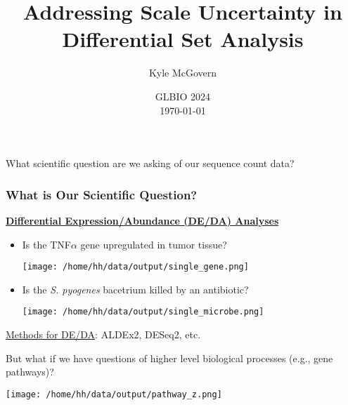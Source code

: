 \documentclass[11pt]{beamer}
\title[DSA Scale Uncertainty]{Addressing Scale Uncertainty in Differential Set Analysis}
\author[Kyle McGovern]{Kyle McGovern}
\institute[Penn State]{The Pennsylvania State University \\ \smallskip \textit{kvm6065@psu.edu}}
\date[\today]{GLBIO 2024 \\ \today}
\begin{document}

\begin{frame}
	\titlepage
\end{frame}

\begin{frame}
  \begin{center}
    What scientific question are we asking of our sequence count data?
  \end{center}
\end{frame}

\begin{frame}
  \frametitle{What is Our Scientific Question?}

  \begin{center}
    \underline{\textbf{Differential Expression/Abundance (DE/DA) Analyses}}
  \end{center}
  
  \begin{itemize}
    \item Is the TNF\(\alpha\) gene upregulated in tumor tissue?

    \begin{center}
      \texttt{[image: /home/hh/data/output/single\_gene.png]}
    \end{center}


    \item Is the \textit{S. pyogenes} bacetrium killed by an antibiotic?
        
     \begin{center}
      \texttt{[image: /home/hh/data/output/single\_microbe.png]}
    \end{center}

      
  \end{itemize}
  
  \vspace{10px}
  \underline{Methods for DE/DA}: ALDEx2, DESeq2, etc.
  
\end{frame}

\begin{frame}
   \begin{center}
    But what if we have questions of higher level biological processes (e.g., gene pathways)?
   \end{center}

   \begin{center}
      \texttt{[image: /home/hh/data/output/pathway\_z.png]}
    \end{center}

\end{frame}
\end{document}
